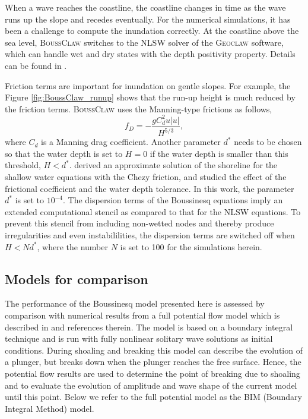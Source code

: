 \documentclass[review]{elsarticle}
\newcommand{\BoussClaw}{\textsc{BoussClaw} }
\begin{document}
When a wave reaches the coastline, 
the coastline changes in time
as the wave runs up the slope and recedes eventually. 
For the numerical simulations, 
it has been a challenge to compute the inundation correctly.
At the coastline above the sea level, \BoussClaw
switches to the NLSW solver of the \textsc{Geoclaw} software,
which can handle 
wet and dry states with the depth positivity property.
Details can be found in \cite{george2008augmented}. 

Friction terms are important for inundation on gentle slopes. 
For example, the Figure \ref{fig:BoussClaw_runup}
shows that the run-up height is much reduced by the friction terms.
\BoussClaw uses the Manning-type frictions as follows,
\begin{equation}
\label{eq:Manning}
f_D = -\frac{g C_d^2 u |u|}{H^{5/3}},
\end{equation}
where $C_d$ is a Manning drag coefficient.
Another parameter $d^*$ needs to be chosen
so that the water depth is set to $H=0$
if the water depth is smaller than this threshold, $H<d^*$.
\cite{antuono2012role} derived an approximate solution
of the shoreline for the shallow water equations 
with the Chezy friction,
and studied the effect of the frictional coefficient and 
the water depth tolerance.
In this work, the parameter $d^*$ is set to $10^{-4}$. 
The dispersion terms of the Boussinesq equations imply an extended computational
stencil as compared to that for the NLSW equations. To prevent this stencil 
from including non-wetted nodes and thereby produce irregularities and even instabililities, the dispersion terms are switched off when $H<Nd^*$, where the number $N$ is set to 100 for the simulations herein.  

\subsection{Models for comparison}
The performance of the Boussinesq model presented here is 
assessed by comparison with numerical results from a full potential
flow model which is described in \citet{Lovholt:2013a} and references therein. The model is based on a boundary 
integral technique and is run  with fully nonlinear solitary
wave solutions as initial conditions. During shoaling and breaking this
model can describe the evolution of a plunger, but breaks down
when the plunger reaches the free surface. Hence, the potential flow 
results are used to determine the point of breaking due to shoaling 
and to
evaluate the evolution of  amplitude and wave 
shape of the current model until this point.   
Below we refer to the full potential model as the BIM (Boundary
 Integral Method) model.
\end{document}
